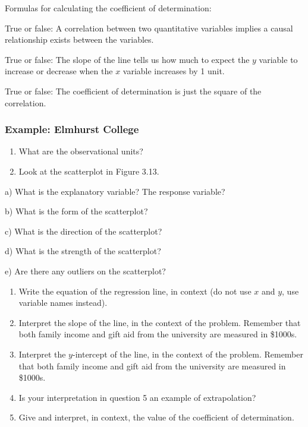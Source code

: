 \documentclass[
]{report}
\newcommand{\rgs}{\vspace{12pt}} %
\newcommand{\rgi}{\hspace{24pt}}  %
\begin{document}
Formulas for calculating the coefficient of determination:
\rgs

True or false: A correlation between two quantitative variables implies a causal relationship exists between the variables.

True or false: The slope of the line tells us how much to expect the \(y\) variable to increase or decrease when the \(x\) variable increases by 1 unit.

True or false: The coefficient of determination is just the square of the correlation.

\hypertarget{example-elmhurst-college}{%
\subsubsection*{Example: Elmhurst College}\label{example-elmhurst-college}}

\begin{enumerate}
\def\labelenumi{\arabic{enumi}.}
\item
  What are the observational units?\\
  \rgs
\item
  Look at the scatterplot in Figure 3.13.
\end{enumerate}

\rgi a) What is the explanatory variable? The response variable?\\
\rgs

\rgi b) What is the form of the scatterplot?\\
\rgs

\rgi c) What is the direction of the scatterplot?
\rgs

\rgi d) What is the strength of the scatterplot?
\rgs

\rgi e) Are there any outliers on the scatterplot?\\
\rgs

\begin{enumerate}
\def\labelenumi{\arabic{enumi}.}
\setcounter{enumi}{2}
\item
  Write the equation of the regression line, in context (do not use \(x\) and \(y\), use variable names instead).
  \rgs
\item
  Interpret the slope of the line, in the context of the problem. Remember that both family income and gift aid from the university are measured in \$1000s.
  \rgs
  \rgs
\item
  Interpret the \(y\)-intercept of the line, in the context of the problem. Remember that both family income and gift aid from the university are measured in \$1000s.
  \rgs
  \rgs
\item
  Is your interpretation in question 5 an example of extrapolation?
  \rgs
\item
  Give and interpret, in context, the value of the coefficient of determination.
  \rgs
  \rgs
\end{enumerate}
\end{document}
